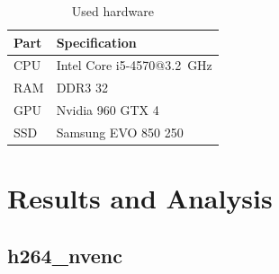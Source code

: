 \documentclass[12pt,twoside]{article}
\begin{document}
\begin{table}[h]
	\centering
	\caption{Used hardware}
	\label{tab:hw}
	\begin{tabu}{ll}
		\toprule[2pt]
		Part                               & Specification \\
		\midrule
		CPU                      & Intel Core i5-4570@\SI{3.2}{\giga\hertz}   \\
		RAM                             &   DDR3 \SI{32}{\giga\byte}     \\
		GPU                               & Nvidia 960 GTX \SI{4}{\giga\byte}         \\
		SSD                               & Samsung EVO 850 \SI{250}{\giga\byte}      \\
		\bottomrule[2pt]
	\end{tabu}
\end{table}
\section{Results and Analysis}
\label{sec:results}
\subsection{h264\_nvenc}
\end{document}
